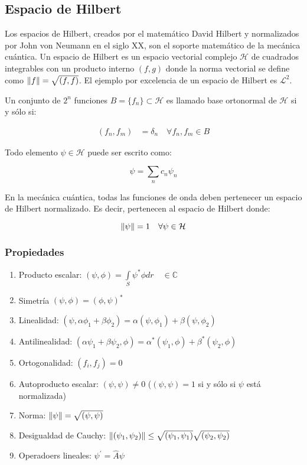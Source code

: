 \subsection{Espacio de Hilbert}

Los espacios de Hilbert, creados por el matemático David Hilbert y normalizados por John von Neumann en el siglo XX, son el soporte matemático de la mecánica cuántica. Un espacio de Hilbert es un espacio vectorial complejo $\mathcal{H}$ de cuadrados integrables con un producto interno $(f,g)$ donde la norma vectorial se define como $\norm{f} = \sqrt{(f,f)}$. El ejemplo por excelencia de un espacio de Hilbert es $\mathcal{L}^2$.

Un conjunto de $2^n$ funciones $B = \{f_n\} \subset \mathcal{H}$ es llamado base ortonormal de $\mathcal{H}$ si y sólo si:

\begin{align}
    (f_n, f_m) &= \delta_{n } \quad \forall f_n, f_m \in B
\end{align}

Todo elemento $\psi \in \mathcal{H}$ puede ser escrito como:

\begin{equation}
    \psi = \sum\limits_n c_n \psi_n
\end{equation}

En la mecánica cuántica, todas las funciones de onda deben pertenecer un espacio de Hilbert normalizado. Es decir, pertenecen al espacio de Hilbert donde:

\begin{equation}
    \norm{\psi} = 1 \quad \forall \psi \in \mathcal{H}
\end{equation}

\subsubsection{Propiedades}

\begin{enumerate}
    \item Producto escalar: $(\psi, \phi) = \int\limits_S \psi^* \phi dr \quad \in \mathds{C}$
    \item Simetría $(\psi, \phi) = (\phi, \psi)^*$
    \item Linealidad: $(\psi, \alpha \phi_1 + \beta \phi_2) = \alpha (\psi, \phi_1) + \beta (\psi, \phi_2)$
    \item Antilinealidad: $(\alpha \psi_1 + \beta \psi_2, \phi) = \alpha^* (\psi_1, \phi) + \beta^* (\psi_2, \phi)$
    \item Ortogonalidad: $(f_i, f_j) = 0$
    \item Autoproducto escalar: $(\psi, \psi) \neq 0$ ($(\psi, \psi) = 1$ si y sólo si $\psi$ está normalizada)
    \item Norma: $\norm{\psi} = \sqrt{(\psi,\psi)}$
    \item Desigualdad de Cauchy: $\norm{(\psi_1,\psi_2)} \leq \sqrt{(\psi_1,\psi_1)} \sqrt{(\psi_2,\psi_2)}$
    \item Operadoers lineales: $\psi^\prime = \hat{A} \psi$
\end{enumerate}

